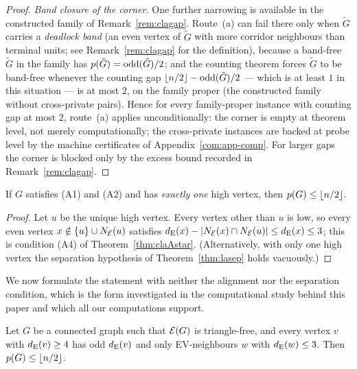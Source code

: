 \begin{proof}
\emph{Band closure of the corner.} One further narrowing is available in
the constructed family of Remark~\ref{rem:clagap}. Route~(a) can fail
there only when $\tilde G$ carries a \emph{deadlock band} (an even vertex
of $\tilde G$ with more corridor neighbours than terminal units; see
Remark~\ref{rem:clagap} for the definition), because a band-free
$\tilde G$ in the family has
$p(\tilde G)=\mathrm{odd}(\tilde G)/2$; and the counting theorem forces
$\tilde G$ to be band-free whenever the counting gap
$\left\lfloor n/2 \right\rfloor-\mathrm{odd}(\tilde G)/2$ --- which is at least $1$ in this
situation --- is at most $2$, on the family proper (the constructed family
without cross-private pairs). Hence for every family-proper instance with
counting gap at most $2$, route~(a) applies unconditionally: the corner is
empty at theorem level, not merely computationally; the cross-private
instances are backed at probe level by the machine certificates of
Appendix~\ref{com:app-comp}. For larger gaps the corner is blocked only by the
excess bound recorded in Remark~\ref{rem:clagap}.
\end{proof}

\begin{corollary}\label{cor:clauniquehigh}
If $G$ satisfies (A1) and (A2) and has \emph{exactly one} high vertex,
then $p(G)\le\left\lfloor n/2 \right\rfloor$.
\end{corollary}

\begin{proof}
Let $u$ be the unique high vertex. Every vertex other than $u$ is low, so
every even vertex $x\notin\{u\}\cup N_{\mathcal{E}}(u)$ satisfies
$d_{\mathrm{E}}(x)-|N_{\mathcal{E}}(x)\cap N_{\mathcal{E}}(u)|\le d_{\mathrm{E}}(x)\le 3$; this is condition
(A4) of Theorem~\ref{thm:claAstar}. (Alternatively, with only one high
vertex the separation hypothesis of Theorem~\ref{thm:lasep} holds
vacuously.)
\end{proof}

We now formulate the statement with neither the alignment nor the
separation condition, which is the form investigated in the computational
study behind this paper and which all our computations support.

\begin{conjecture}\label{conj:claAstar}
Let $G$ be a connected graph such that $\mathcal{E}(G)$ is triangle-free, and
every vertex $v$ with $d_{\mathrm{E}}(v)\ge 4$ has odd $d_{\mathrm{E}}(v)$ and only
EV-neighbours $w$ with $d_{\mathrm{E}}(w)\le 3$. Then $p(G)\le\left\lfloor n/2 \right\rfloor$.
\end{conjecture}


